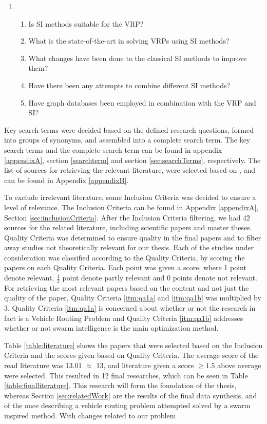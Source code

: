 \begin{enumerate}[label=\textbf{\arabic*})]
\item 
    \begin{enumerate}
    \item Is SI methods suitable for the VRP?
    \item What is the state-of-the-art in solving VRPs using SI methods?
    \item What changes have been done to the classical SI methods to improve them?
    \item Have there been any attempts to combine different SI methods?
    \item Have graph databases been employed in combination with the VRP and SI?
    \end{enumerate}
\end{enumerate}

Key search terms were decided based on the defined research questions, formed into groups of synonyms, and assembled into a complete search term. The key search terms and the complete search term can be found in appendix \ref{appendixA}, section \vref{searchterm} and section \vref{sec:searchTerms}, respectively. The list of sources for retrieving the  relevant literature, were selected based on \citep[p.3]{kofod2014}, and can be found in Appendix \vref{appendixB}. 

To exclude irrelevant literature, some Inclusion Criteria was decided to ensure a level of relevance. The Inclusion Criteria can be found in Appendix \ref{appendixA}, Section \ref{sec:inclusionCriteria}. After the Inclusion Criteria filtering, we had 42 sources for the related literature, including scientific papers and master theses. Quality Criteria was determined to ensure quality in the final papers and to filter away studies not theoretically relevant for our thesis. Each of the studies under consideration was classified according to the Quality Criteria, by scoring the papers on each Quality Criteria. Each point was given a score, where 1 point denote relevant, $\frac{1}{2}$ point denote partly relevant and 0 points denote not relevant. For retrieving the most relevant papers based on the content and not just the quality of the paper, Quality Criteria \ref{itm:qa1a} and \vref{itm:qa1b} was multiplied by 3. Quality Criteria \ref{itm:qa1a} is concerned about whether or not the research in fact is a Vehicle Routing Problem and Quality Criteria \ref{itm:qa1b} addresses whether or not swarm intelligence is the main optimization method. 

Table \vref{table:literature} shows the papers that were selected based on the Inclusion Criteria and the scores given based on Quality Criteria. The average score of the read literature was 13.01 $\approx$ 13, and literature given a score $\geq{1.5}$ above average were selected. This resulted in 12 final researches, which can be seen in Table \vref{table:finalliterature}. This research will form the foundation of the thesis, whereas Section \vref{sec:relatedWork} are the results of the final data synthesis, and of the once describing a vehicle routing problem attempted solved by a swarm inspired method. With changes related to our problem 
